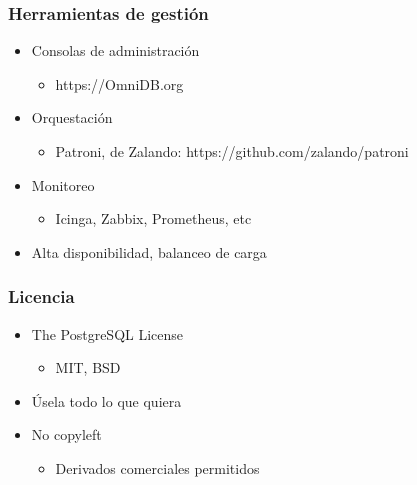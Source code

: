 \begin{frame}
  \frametitle{Herramientas de gestión}

  \begin{itemize}
    \item Consolas de administración
      \begin{itemize}
	\item https://OmniDB.org
      \end{itemize}
    \item Orquestación
      \begin{itemize}
	\item Patroni, de Zalando: https://github.com/zalando/patroni
      \end{itemize}
    \item Monitoreo
      \begin{itemize}
	\item Icinga, Zabbix, Prometheus, etc
      \end{itemize}
    \item Alta disponibilidad, balanceo de carga
  \end{itemize}
\end{frame}

\begin{frame}
  \frametitle{Licencia}

    \begin{itemize}
      \item The PostgreSQL License
	\begin{itemize}
	  \item MIT, BSD
	\end{itemize}
      \item Úsela todo lo que quiera
      \item No copyleft
	\begin{itemize}
      \item Derivados comerciales permitidos
	\end{itemize}
    \end{itemize}
\end{frame}

